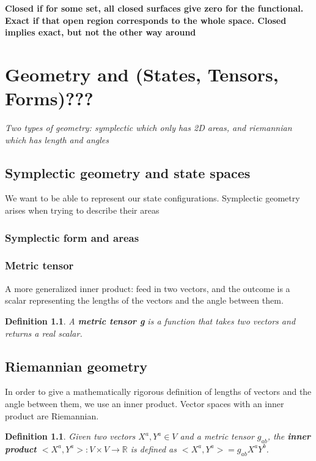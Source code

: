 \documentclass{book}
\newtheorem{defn}[equation]{Definition}
\begin{document}
\textbf{Closed if for some set, all closed surfaces give zero for the functional. Exact if that open region corresponds to the whole space. Closed implies exact, but not the other way around}







\chapter{Geometry and (States, Tensors, Forms)???}

\emph{Two types of geometry: symplectic which only has 2D areas, and riemannian which has length and angles}


\section{Symplectic geometry and state spaces}
We want to be able to represent our state configurations. Symplectic geometry arises when trying to describe their areas

\subsection{Symplectic form and areas}



\subsection{Metric tensor}
A more generalized inner product: feed in two vectors, and the outcome is a scalar representing the lengths of the vectors and the angle between them. 

\begin{defn}
	A \textbf{metric tensor g} is a function that takes two vectors and returns a real scalar. 
\end{defn}


\section{Riemannian geometry}
In order to give a mathematically rigorous definition of lengths of vectors and the angle between them, we use an inner product. Vector spaces with an inner product are Riemannian.

\begin{defn}
	Given two vectors $X^a,Y^a \in V$ and a metric tensor $g_{ab}$, the \textbf{inner product} $<X^a,Y^a> : V \times V \to \mathbb{R}$ is defined as $<X^a,Y^a> = g_{ab}X^aY^b$. 
\end{defn}
\end{document}
